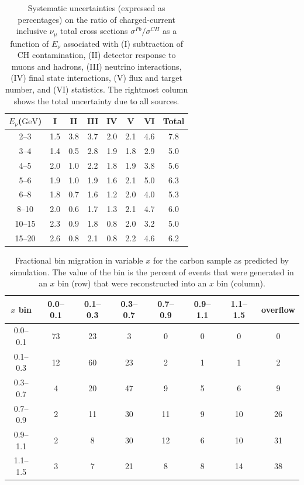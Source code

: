 \documentclass[aps,preprint,showpacs,superscriptaddress]{revtex4} %
\newcommand{\numu}{\ensuremath{\nu_{\mu}}\xspace}
\newcommand{\GeV}{\ensuremath{\mbox{GeV}}\xspace}
\newcommand{\Xbj}{\ensuremath{x}\xspace}
\newcommand{\Enu}{\ensuremath{E_{\nu}}\xspace}
\begin{document}
\begingroup
\squeezetable
\begin{table}
  \begin{tabular}{cccccccc}
    \hline \hline
    \Enu (\GeV) & I & II & III & IV & V & VI & Total \\ 
    \hline
    2--3 & 1.5 & 3.8 & 3.7 & 2.0 & 2.1 & 4.6 & 7.8 \\ 
    3--4 & 1.4 & 0.5 & 2.8 & 1.9 & 1.8 & 2.9 & 5.0 \\ 
    4--5 & 2.0 & 1.0 & 2.2 & 1.8 & 1.9 & 3.8 & 5.6 \\ 
    5--6 & 1.9 & 1.0 & 1.9 & 1.6 & 2.1 & 5.0 & 6.3 \\ 
    6--8 & 1.8 & 0.7 & 1.6 & 1.2 & 2.0 & 4.0 & 5.3 \\ 
    8--10 & 2.0 & 0.6 & 1.7 & 1.3 & 2.1 & 4.7 & 6.0 \\ 
    10--15 & 2.3 & 0.9 & 1.8 & 0.8 & 2.0 & 3.2 & 5.0 \\ 
    15--20 & 2.6 & 0.8 & 2.1 & 0.8 & 2.2 & 4.6 & 6.2 \\ 
    \hline \hline
  \end{tabular}
  \caption{Systematic uncertainties (expressed as percentages) on the ratio of charged-current inclusive \numu total cross sections $\sigma^{Pb}/\sigma^{CH}$ as a function of \Enu associated with  (I) subtraction of CH contamination, (II) detector response to muons and hadrons, (III) neutrino interactions, (IV) final state interactions, (V) flux and target number, and (VI) statistics.  The rightmost column shows the total uncertainty due to all sources.}
  \label{tab:Enu_ratio_82_93_sys_errors}
\end{table}
\endgroup

\begingroup
\squeezetable
\begin{table}
\begin{tabular}{c|ccccccc}
\hline \hline
\Xbj bin & 0.0--0.1 & 0.1--0.3 & 0.3--0.7 & 0.7--0.9 & 0.9--1.1 & 1.1--1.5 & overflow \\ 
\hline
0.0--0.1 & 73 & 23 & 3 & 0 & 0 & 0 & 0 \\ 
0.1--0.3 & 12 & 60 & 23 & 2 & 1 & 1 & 2 \\ 
0.3--0.7 & 4 & 20 & 47 & 9 & 5 & 6 & 9 \\ 
0.7--0.9 & 2 & 11 & 30 & 11 & 9 & 10 & 26 \\ 
0.9--1.1 & 2 & 8 & 30 & 12 & 6 & 10 & 31 \\ 
1.1--1.5 & 3 & 7 & 21 & 8 & 8 & 14 & 38 \\ 
\hline \hline
\end{tabular}
\caption{Fractional bin migration in variable \Xbj for the carbon sample as predicted by simulation.  The value of the bin is the percent of events that were generated in an \Xbj bin (row) that were reconstructed into an \Xbj bin (column).}
\label{tab:x_06_migration_table}
\end{table}
\endgroup
\end{document}
